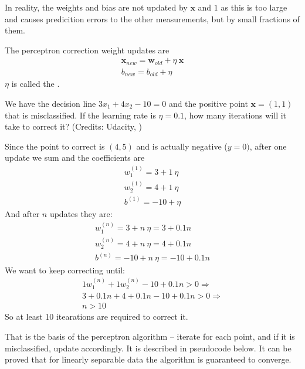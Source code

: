 \documentclass[a4paper]{article}
\begin{document}
In reality, the weights and bias are not updated by $\textbf{x}$ and $1$ as this is too large and causes predicition errors to the other measurements, but by small fractions of them.
\begin{definition}
The perceptron correction weight updates are
\begin{gather}
    \textbf{x}_{new} = \textbf{w}_{old} + \eta\ \textbf{x}\\
    b_{new} = b_{old} + \eta
\end{gather}
$\eta$ is called the .
\end{definition}
\begin{exmp}
We have the decision line $3x_1+4x_2-10=0$ and the positive point $\textbf{x}=(1,1)$ that is misclassified. If the learning rate is $\eta=0.1$, how many iterations will it take to correct it? (Credits: Udacity, \TODO)
\end{exmp}
\begin{soln}
Since the point to correct is $(4,5)$ and is actually negative ($y=0)$, after one update we sum and the coefficients are
\begin{gather*}
    w_1^{(1)} = 3 + 1\ \eta\\
    w_2^{(1)} = 4 + 1\ \eta \\
    b^{(1)} = -10 + \eta
\end{gather*}
And after $n$ updates they are:
\begin{gather*}
    w_1^{(n)} = 3 +  n\ \eta = 3+0.1n\\
    w_2^{(n)} = 4 + n \ \eta = 4+0.1n \\
    b^{(n)} = -10 + n\ \eta  = -10+0.1n
\end{gather*}
We want to keep correcting until:
\begin{gather}
    1 w_1^{(n)} + 1 w_2^{(n)} - 10 + 0.1n > 0 \Rightarrow\\
    3+0.1n + 4+0.1n- 10+0.1n > 0 \Rightarrow \\
    n > 10
\end{gather}
So at least 10 itearations are required to correct it.
\end{soln}
That is the basis of the perceptron algorithm -- iterate for each point, and if it is misclassified, update accordingly. It is described in pseudocode below. It can be proved that for linearly separable data the algorithm is guaranteed to converge.
\end{document}
